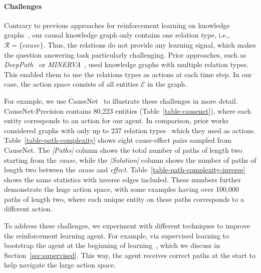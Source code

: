 \paragraph{Challenges}
Contrary to previous approaches for reinforcement learning on 
knowledge graphs~\cite{Xiong2017DeePpath, Das2018Minerva, Qiu2020Stepwise}, our causal 
knowledge graph only contains one 
 relation type, i.e., $\mathcal{R} = \{cause\}$.
Thus, the relations do not provide any learning signal, which makes the question
 answering task particularly challenging.
Prior approaches, such as \textit{DeepPath}~\cite{Xiong2017DeePpath} or \textit{MINERVA}~\cite{Das2018Minerva},
used knowledge graphs with multiple relation types. This enabled them to use the 
relations types as actions at each time step. In our case, the action space consists 
of all entities $\mathcal{E}$ in the graph. 

For example, we use CauseNet~\cite{Heindorf2020Causenet} to illustrate these challenges in more detail.
CauseNet-Precision contains 80,223 entities (Table~\ref{table-causenet}), where 
each entity corresponds to an action for our agent. In comparison, prior works considered
graphs with only up to 237 relation types~\cite{Das2018Minerva} which they used as actions.
Table~\ref{table-path-complexity} shows eight cause-effect pairs 
sampled from CauseNet. The \textit{|Paths|} column shows the total number of paths 
of length two starting from the \textit{cause}, while the \textit{|Solution|} column 
shows the number of paths of length two between the \textit{cause} and \textit{effect}.
Table~\ref{table-path-complexity-inverse} shows the same statistics with inverse edges 
included. These numbers further demonstrate the huge action space, with some examples having over 100,000 paths of length two, where each unique entity on these paths corresponds to a 
different action. 



To address these challenges, we experiment with different techniques to improve the 
reinforcement learning agent. For example, via supervised learning to bootstrap the agent
 at the beginning of learning~\cite{Xiong2017DeePpath}, which we discuss in Section~\ref{sec:supervised}. This way,
 the agent receives correct paths at the start to help navigate the large action space.

%

